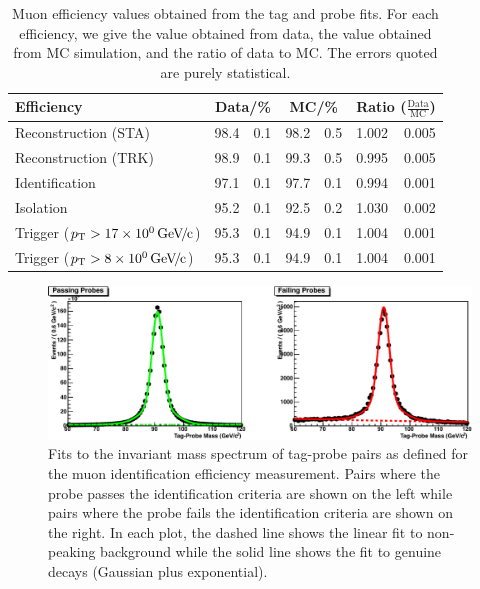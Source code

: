 \begin{table}[p]
  \newcommand{\sep}{$\,\pm\,$}
  \centering
  \begin{tabular}{l l@{\sep}r l@{\sep}r l@{\sep}r}
    \toprule
    Efficiency & \multicolumn{2}{c}{Data/\%} & \multicolumn{2}{c}{MC/\%} & \multicolumn{2}{c}{Ratio ($\frac{\text{Data}}{\text{MC}}$)} \\
    \midrule
    Reconstruction (STA) & 98.4&0.1 & 98.2&0.5 & 1.002&0.005 \\
    Reconstruction (TRK) & 98.9&0.1 & 99.3&0.5 & 0.995&0.005 \\
    Identification       & 97.1&0.1 & 97.7&0.1 & 0.994&0.001 \\
    Isolation            & 95.2&0.1 & 92.5&0.2 & 1.030&0.002 \\
    Trigger \hfill($p_{\mathrm{T}} > \SI{17}{\ensuremath{{\text{Ge\hspace{-.08em}V\hspace{-0.16em}/\hspace{-0.08em}c}}}}$) & 95.3&0.1 & 94.9&0.1 & 1.004&0.001 \\
    Trigger \hfill($p_{\mathrm{T}} > \SI{08}{\ensuremath{{\text{Ge\hspace{-.08em}V\hspace{-0.16em}/\hspace{-0.08em}c}}}}$) & 95.3&0.1 & 94.9&0.1 & 1.004&0.001 \\
    \bottomrule
  \end{tabular}
  \caption[Muon efficiency values obtained from the tag and probe
fits]{Muon efficiency values obtained from the tag and probe
fits.  For each efficiency, we give the value obtained from data, the
value obtained from MC simulation, and the ratio of data to MC.  The
errors quoted are purely statistical.}
\label{tab:muon-efficiencies}
\end{table}

\begin{figure}[p]
  \centering
  \includegraphics[width=\textwidth,clip=true]{matplotlib/efficiencies/fits-muonid-crop}
  \caption[Example fits to tag-probe muon pairs.]{Fits to the invariant mass spectrum of tag-probe pairs as defined for the muon identification efficiency measurement.  Pairs where the probe passes the identification criteria are shown on the left while pairs where the probe fails the identification criteria are shown on the right.  In each plot, the dashed line shows the linear fit to non-peaking background while the solid line shows the fit to genuine \ztomumu decays (Gaussian plus exponential).}
  \label{fig:muon-fits}
\end{figure}

